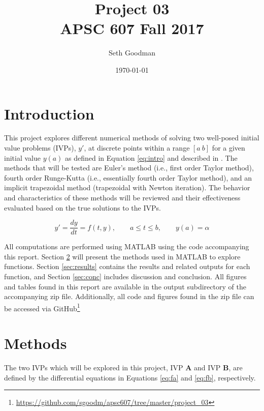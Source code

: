 \documentclass{article}
\title{
	Project 03 \\
	\bigskip
	\normalsize APSC 607 Fall 2017
}
\author{Seth Goodman}
\date{\today}
\begin{document}
\maketitle



\setlength{\abovedisplayskip}{1pt}
\setlength{\belowdisplayskip}{1pt}

\section{Introduction}
\label{sec:introduction}

This project explores different numerical methods of solving two well-posed initial value problems (IVPs), $y'$, at discrete points within a range $[a\ b]$ for a given initial value $y(a)$ as defined in Equation \ref{eq:intro} and described in \cite{burden2010}. The methods that will be tested are Euler's method (i.e., first order Taylor method), fourth order Runge-Kutta (i.e., essentially fourth order Taylor method), and an implicit trapezoidal method (trapezoidal with Newton iteration). The behavior and characteristics of these methods will be reviewed and their effectiveness evaluated based on the true solutions to the IVPs.

\begin{equation}
y' = \frac{dy}{dt} = f(t,y), \qquad a \leq t \leq b, \qquad  y(a) = \alpha
\label{eq:intro}
\end{equation}

All computations are performed using MATLAB using the code accompanying this report. Section \ref{sec:methods} will present the methods used in MATLAB to explore functions. Section \ref{sec:results} contains the results and related outputs for each function, and Section \ref{sec:conc} includes discussion and conclusion. All figures and tables found in this report are available in the output subdirectory of the accompanying zip file. Additionally, all code and figures found in the zip file can be accessed via GitHub\footnote{\url{https://github.com/sgoodm/apsc607/tree/master/project_03}}

\newpage
\section{Methods}
\label{sec:methods}

The two IVPs which will be explored in this project, IVP \textbf{A} and IVP \textbf{B}, are defined by the differential equations in Equations \ref{eq:fa} and \ref{eq:fb}, respectively.
\end{document}
